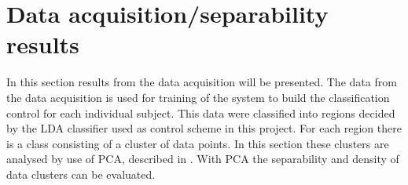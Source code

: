 \section{Data acquisition/separability results}
In this section results from the data acquisition will be presented. The data from the data acquisition is used for training of the system to build the classification control for each individual subject. This data were classified into regions decided by the LDA classifier used as control scheme in this project. For each region there is a class consisting of a cluster of data points. In this section these clusters are analysed by use of PCA, described in . With PCA the separability and density of data clusters can be evaluated.







